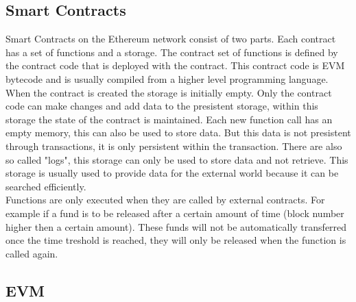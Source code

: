 \documentclass[a4paper]{article}
\begin{document}
\subsection{Smart Contracts}
Smart Contracts on the Ethereum network consist of two parts. Each contract has a set of functions and a storage. The contract set of functions is defined by the contract code that is deployed with the contract. This contract code is EVM bytecode and is usually compiled from a higher level programming language. When the contract is created the storage is initially empty. Only the contract code can make changes and add data to the presistent storage, within this storage the state of the contract is maintained. Each new function call has an empty memory, this can also be used to store data. But this data is not presistent through transactions, it is only persistent within the transaction. There are also so called "logs", this storage can only be used to store data and not retrieve. This storage is usually used to provide data for the external world because it can be searched efficiently.\\
Functions are only executed when they are called by external contracts. For example if a fund is to be released after a certain amount of time (block number higher then a certain amount). These funds will not be automatically transferred once the time treshold is reached, they will only be released when the function is called again.\\



\subsection{EVM}
\end{document}
